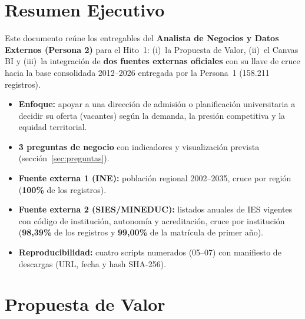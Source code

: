 \documentclass[11pt,a4paper]{article}
\begin{document}
\tableofcontents
\newpage

\section{Resumen Ejecutivo}
Este documento re\'une los entregables del \textbf{Analista de Negocios y Datos Externos (Persona 2)} para el Hito~1: (i)~la Propuesta de Valor, (ii)~el Canvas BI y (iii)~la integraci\'on de \textbf{dos fuentes externas oficiales} con su llave de cruce hacia la base consolidada 2012--2026 entregada por la Persona~1 (158.211 registros).

\begin{tcolorbox}[colback=white, colframe=accentteal, title=\textbf{Cuadro Resumen del Hito 1 (Persona 2)}]
\begin{itemize}
    \item \textbf{Enfoque:} apoyar a una direcci\'on de admisi\'on o planificaci\'on universitaria a decidir su oferta (vacantes) seg\'un la demanda, la presi\'on competitiva y la equidad territorial.
    \item \textbf{3 preguntas de negocio} con indicadores y visualizaci\'on prevista (secci\'on~\ref{sec:preguntas}).
    \item \textbf{Fuente externa 1 (INE):} poblaci\'on regional 2002--2035, cruce por regi\'on (\textbf{100\%} de los registros).
    \item \textbf{Fuente externa 2 (SIES/MINEDUC):} listados anuales de IES vigentes con c\'odigo de instituci\'on, autonom\'ia y acreditaci\'on, cruce por instituci\'on (\textbf{98,39\%} de los registros y \textbf{99,00\%} de la matr\'icula de primer a\~no).
    \item \textbf{Reproducibilidad:} cuatro scripts numerados (05--07) con manifiesto de descargas (URL, fecha y hash SHA-256).
\end{itemize}
\end{tcolorbox}

\section{Propuesta de Valor}
\end{document}
